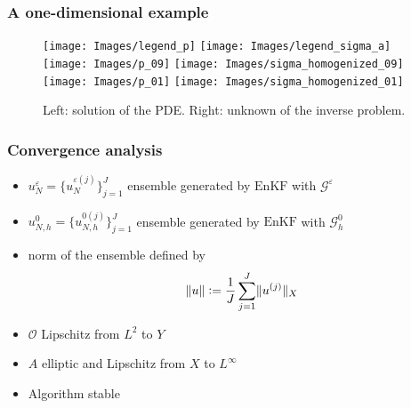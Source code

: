 \begin{frame}
\frametitle{A one-dimensional example}
\begin{figure}
\hspace{0.65cm}
\texttt{[image: Images/legend\_p]}
\hspace{1.85cm}
\texttt{[image: Images/legend\_sigma\_a]}
\\	
\texttt{[image: Images/p\_09]}
\hspace{1cm}
\texttt{[image: Images/sigma\_homogenized\_09]}
\\
\texttt{[image: Images/p\_01]}
\hspace{1cm}
\texttt{[image: Images/sigma\_homogenized\_01]}
\caption{Left: solution of the PDE. Right: unknown of the inverse problem.}
\end{figure}
\end{frame}

\begin{frame}
\frametitle{Convergence analysis}
\begin{itemize}
\item $u_N^{\varepsilon} = \{ u_N^{\varepsilon(j)} \}_{j=1}^J$ ensemble generated by $\mathrm{EnKF}$ with $\mathcal{G}^{\varepsilon}$
\item $u^0_{N,h} = \{ u^{0(j)}_{N,h} \}_{j=1}^J$ ensemble generated by $\mathrm{EnKF}$ with $\mathcal{G}^0_h$
\item norm of the ensemble defined by
\[ \lVert u\rVert \vcentcolon = \frac{1}{J} \sum_{j=1}^J \lVert u^{(j)}\rVert_X \]
\end{itemize}
\begin{greenblock}
\begin{itemize}
\item $\mathcal{O}$ Lipschitz from $L^2$ to $Y$
\item $A$ elliptic and Lipschitz from $X$ to $L^{\infty}$
\item Algorithm stable
\end{itemize}
\end{greenblock}
\end{frame}


